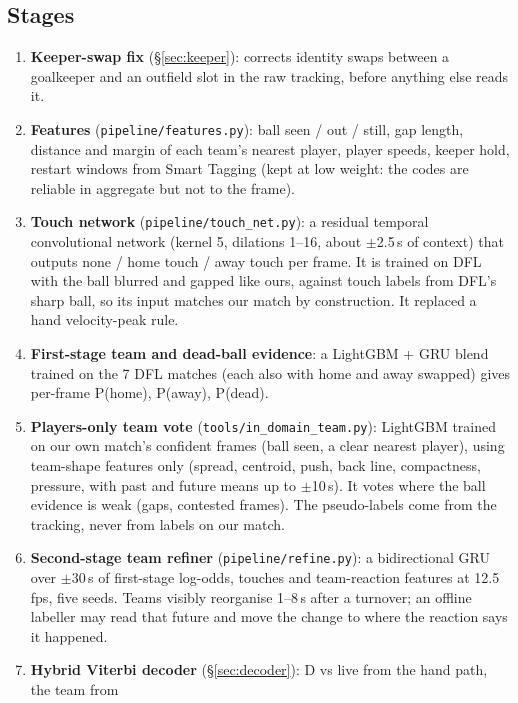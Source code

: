 \documentclass[10pt,a4paper]{article}
\newcommand{\code}[1]{\texttt{\small #1}}
\begin{document}
\subsection{Stages}
\begin{enumerate}[label=\textbf{\arabic*}]
  \item \textbf{Keeper-swap fix} (\S\ref{sec:keeper}): corrects identity swaps between a goalkeeper and an
        outfield slot in the raw tracking, before anything else reads it.
  \item \textbf{Features} (\code{pipeline/features.py}): ball seen / out / still, gap length, distance
        and margin of each team's nearest player, player speeds, keeper hold, restart windows from
        Smart Tagging (kept at low weight: the codes are reliable in aggregate but not to the frame).
  \item \textbf{Touch network} (\code{pipeline/touch\_net.py}): a residual temporal convolutional
        network (kernel 5, dilations 1--16, about $\pm$2.5\,s of context) that outputs none / home
        touch / away touch per frame. It is trained on DFL with the ball blurred and gapped like
        ours, against touch labels from DFL's sharp ball, so its input matches our match by
        construction. It replaced a hand velocity-peak rule.
  \item \textbf{First-stage team and dead-ball evidence}: a LightGBM + GRU blend trained on the 7 DFL
        matches (each also with home and away swapped) gives per-frame P(home), P(away), P(dead).
  \item \textbf{Players-only team vote} (\code{tools/in\_domain\_team.py}): LightGBM trained on our own
        match's confident frames (ball seen, a clear nearest player), using team-shape features only
        (spread, centroid, push, back line, compactness, pressure, with past and future means up to
        $\pm$10\,s). It votes where the ball evidence is weak (gaps, contested frames). The
        pseudo-labels come from the tracking, never from labels on our match.
  \item \textbf{Second-stage team refiner} (\code{pipeline/refine.py}): a bidirectional GRU over
        $\pm$30\,s of first-stage log-odds, touches and team-reaction features at 12.5\,fps, five seeds.
        Teams visibly reorganise 1--8\,s after a turnover; an offline labeller may read that future
        and move the change to where the reaction says it happened.
  \item \textbf{Hybrid Viterbi decoder} (\S\ref{sec:decoder}): D vs live from the hand path, the team from

\end{enumerate}
\end{document}
